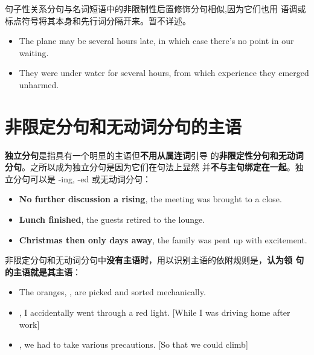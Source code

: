 句子性关系分句与名词短语中的非限制性后置修饰分句相似,因为它们也用
语调或标点符号将其本身和先行词分隔开来。暂不详述。
\begin{itemize}
\item The plane may be several hours late, in which case there's no point in our waiting.

\item They were under water for several hours, from which experience they
  emerged unharmed.
\end{itemize}


\section{非限定分句和无动词分句的主语}

\textbf{独立分句}是指具有一个明显的主语但\textbf{不用从属连词}引导
的\textbf{非限定性分句和无动词分句}。之所以成为独立分句是因为它们在句法上显然
并\textbf{不与主句绑定在一起}。独立分句可以是 -ing, -ed 或无动词分句：
\begin{itemize}
\item \textbf{No further discussion a rising}, the meeting was brought to a close.
\item \textbf{Lunch finished}, the guests retired to the lounge.
\item \textbf{Christmas then only days away}, the family was pent up with excitement.
\end{itemize}

非限定分句和无动词分句中\textbf{没有主语时}，用以识别主语的依附规则是，\textbf{认为领
句的主语就是其主语}：
\begin{itemize}
\item The oranges, , are picked and sorted
  mechanically.

\item {}, I accidentally went through a red
  light. [While I was driving home after work]

\item {}, we had to take various precautions. [So that
  we could climb]

\end{itemize}

